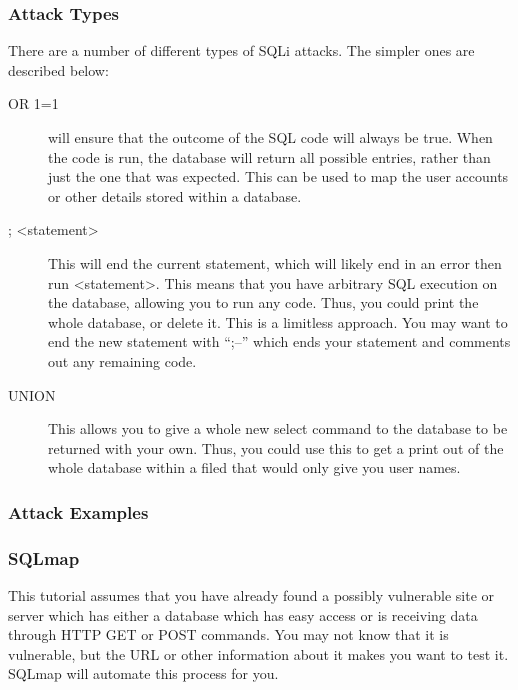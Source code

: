 		\subsubsection{Attack Types}
			There are a number of different types of SQLi attacks. 
			The simpler ones are described below:
			\begin{description}
				\item[OR 1=1] will ensure that the outcome of the SQL code will always be true. 
					When the code is run, the database will return all possible entries, rather than just the one that was expected. 
					This can be used to map the user accounts or other details stored within a database. 
				\item[; <statement>] This will end the current statement, which will likely end in an error then run <statement>.
					This means that you have arbitrary SQL execution on the database, allowing you to run any code. 
					Thus, you could print the whole database, or delete it. 
					This is a limitless approach. 
					You may want to end the new statement with ``;--'' which ends your statement and comments out any remaining code. 
				\item[UNION] This allows you to give a whole new select command to the database to be returned with your own. 
					Thus, you could use this to get a print out of the whole database within a filed that would only give you user names. 

			\end{description}
		\subsubsection{Attack Examples}
			
		\subsubsection{SQLmap}
			This tutorial assumes that you have already found a possibly vulnerable site or server which has either a database which has easy access or is receiving data through HTTP GET or POST commands. 
			You may not know that it is vulnerable, but the URL or other information about it makes you want to test it. 
			SQLmap will automate this process for you. 

